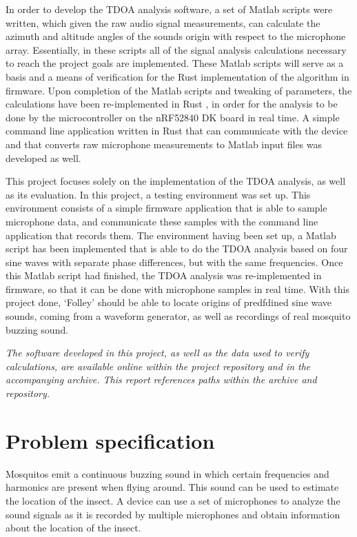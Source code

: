 \documentclass[a4paper]{article}
\begin{document}
In order to develop the TDOA analysis software, a set of Matlab \cite{matlab} scripts were written, which given the raw audio signal measurements, can calculate the azimuth and altitude angles of the sounds origin with respect to the microphone array. Essentially, in these scripts all of the signal analysis calculations necessary to reach the project goals are implemented. These Matlab scripts will serve as a basis and a means of verification for the Rust implementation of the algorithm in firmware. Upon completion of the Matlab scripts and tweaking of parameters, the calculations have been re-implemented in Rust \cite{rust}, in order for the analysis to be done by the microcontroller on the nRF52840 DK \cite{nrf52840-dk} board in real time. A simple command line application written in Rust that can communicate with the device and that converts raw microphone measurements to Matlab input files was developed as well.

This project focuses solely on the implementation of the TDOA analysis, as well as its evaluation. In this project, a testing environment was set up. This environment consists of a simple firmware application that is able to sample microphone data, and communicate these samples with the command line application that records them. The environment having been set up, a Matlab script has been implemented that is able to do the TDOA analysis based on four sine waves with separate phase differences, but with the same frequencies. Once this Matlab script had finished, the TDOA analysis was re-implemented in firmware, so that it can be done with microphone samples in real time. With this project done, `Folley' should be able to locate origins of predfdined sine wave sounds, coming from a waveform generator, as well as recordings of real mosquito buzzing sound.

\textit{The software developed in this project, as well as the data used to verify calculations, are available online within the project repository \cite{repo} and in the accompanying archive. This report references paths within the archive and repository.}

\section{Problem specification}
Mosquitos emit a continuous buzzing sound in which certain frequencies and harmonics are present when flying around. This sound can be used to estimate the location of the insect. A device can use a set of microphones to analyze the sound signals as it is recorded by multiple microphones and obtain information about the location of the insect.
\end{document}
